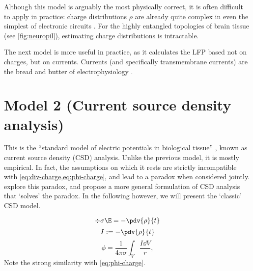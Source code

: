 Although this model is arguably the most physically correct, it is often difficult to apply in practice: charge distributions $\rho$ are already quite complex in even the simplest of electronic circuits \cite[chapter 8]{Chabay2015}. For the highly entangled topologies of brain tissue (see \cref{fig:neuropil}), estimating charge distributions is intractable.

The next model is more useful in practice, as it calculates the LFP based not on charges, but on currents. Currents (and specifically transmembrane currents) are the bread and butter of electrophysiology \cite{Kandel2013a}.



\section{Model 2 (Current source density analysis)}
\label{sec:CSD}

This is the ``standard model of electric potentials in biological tissue'' \cite{Bedard2011}, known as current source density (CSD) analysis. Unlike the previous model, it is mostly empirical. In fact, the assumptions on which it rests are strictly incompatible with \cref{eq:div-charge,eq:phi-charge}, and lead to a paradox when considered jointly.  explore this paradox, and propose a more general formulation of CSD analysis that `solves' the paradox. In the following however, we will present the `classic' CSD model.


%
\begin{equation}
\label{eq:div-current}
\div{\sigma \E} = - \pdv{\rho}{t}
\end{equation}
%
%
\begin{equation}
\label{eq:CSD}
I := - \pdv{\rho}{t}
\end{equation}
%
%
\begin{equation}
\label{eq:phi-current}
\phi = \frac{1}{4 \pi \sigma} \int_V \frac{I \dd{V}}{r},
\end{equation}
%
Note the strong similarity with \cref{eq:phi-charge}.






